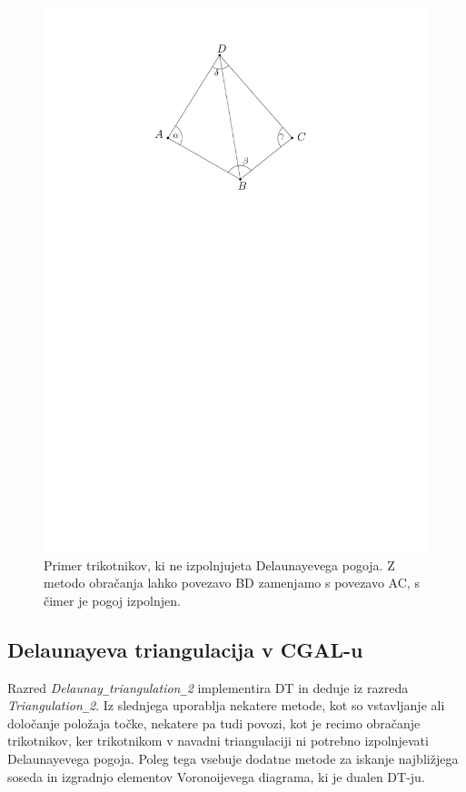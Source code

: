 \documentclass[a4paper, 12pt]{book}
\newcommand{\U}{\texttt{\_}}
\begin{document}
\begin{figure}[htp]
\centerline{\includegraphics[scale=0.8]{pics/dt-triangle.pdf}}
\caption{Primer trikotnikov, ki ne izpolnjujeta Delaunayevega pogoja. Z metodo obračanja lahko povezavo BD zamenjamo s povezavo AC, s čimer je pogoj izpolnjen.}
\label{dt-triangle}
\end{figure}

\subsection{Delaunayeva triangulacija v CGAL-u}
Razred \textit{Delaunay\U triangulation\U 2} implementira DT in deduje iz razreda \textit{Triangulation\U 2}. Iz slednjega uporablja nekatere metode, kot so vstavljanje ali določanje položaja točke, nekatere pa tudi povozi, kot je recimo obračanje trikotnikov, ker trikotnikom v navadni triangulaciji ni potrebno izpolnjevati Delaunayevega pogoja. Poleg tega vsebuje dodatne metode za iskanje najbližjega soseda in izgradnjo elementov Voronoijevega diagrama, ki je dualen DT-ju.
\end{document}
